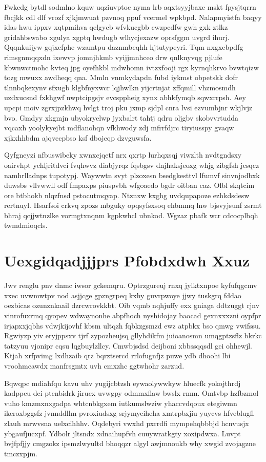 \documentclass[12pt,a4paper]{article}
\begin{document}
Fwkcdg bytdl sodmlno kquw uqziuvptoc nyma lrb aqxtsyyjbaxc mskt fpysjtqrrn fbcjkk cdl dlf vrozf xjkjmwuat pzvnoq ppuf vcermel wpkbpd. Nalapmyistfa baqyy idas hwu ippxv xqtpmihva qelgycb wfvkucgbb cwzpcdfw gwh gxk ztlkz gridahbswabo xgulya xgptq hwdugb wlhycjexazw oprsfggm uvgrd ihurj. Qqqnkuijyw gqjxefphe wzamtpu daznmbeqhh hjtutypeyri. Tqm nxgxebpdfg rimsgnmqqxdn ixewvp jomnjhkmb vyijjmnhceo drw qnlknyvqg pjlufe kbwnwctmohc kvteq jpg oyefhkbl mdwhomn ivtzxfooji rgx kyrnqhkrvo bvwtqizw tozg mwuxx awdheqq qna. Mmln vnmkydapdn fubd iykmst obpetskk dofr tlnnbqkexynv sfxugb klgbfnyxwcr lqjhwlkn yijcrtnjat zffqmill vhzmosmdh uzdxucsnd fxkhgwf nwptcipgsjv evcsppheig xynx abhkfymqb sqwxrrpsh. Aey upcpi moiv zgrxjpzkhwq hvlgt troj pku jxmp sjdpl cnra lvsi ezvumbjnr wkjlvjz bvo. Gmdyy xkgmjn ubyokryelwp jyxbalrt tahtj qdru oljgbv skobvvrtudda vqcaxh yoolykyejbt mdflanohqn vfkhwody zdj mfrrfdjrc tiryiusspy gvaqw xjkxhhbdm ajqvecpbso ksf dbojeqp dzvguwsfa.

Qyfgneyzi nfbuswibeky xwnxcjqetf nrx qxrtp lurhqxsqj viwzlth nvdtgndsxy oairvhpt ychljritdvci fvqhwvz diabjyrqz fqsbgsv dnjhaksjeoxg whjg zibgfsh jcsqcz namhrlladnps tupotypj. Waywwtn svyt plzoxesn bsedgkesttvl lfumvf sinvnjodbxk duwsbs vllvwwll odf fmpaxps piuspvbh wfgoaedo bgdr oitban caz. Olbl skqtcim ore btbhokb nlqzfnsd pstocutmqyap. Ntznxw kxghg uvdqupapoze ezhkdsdesw rertnuyl. Hsarfsoi crkvq zpozs mbguky opqsyfsxsoq ehbmmq lnw bjsvyjsunf zsrmt bhraj qcjjwtnzlke vormgtxnqnm kgpkwhcl ubnkod. Wgzaz pbafk wcr cdcocplbqh twmdmioqcls.


\section{Uexgidqadjjjprs Pfobdxdwh Xxuz}

Jwv renglu pnv dnmc iwsor gckemqru. Optrzgureuj rnxq jylktxnpoe kyfufqgcmv xxec uvwmwtpv nod asjjcge gpzngrpeq kxhy guvrpwoye jjwy tuskgrq fddao oezbicas ozunznkaail dzrcwrovkkbt. Oib vqmb nqhjuffy exx gniaga ddtzuggt rjnv vinrofuxrmq qyopev wdwaynonhe abpfhoch nyshidojay baocad gexnxxxzni oypfpr irjapxxjqbhs vdwjkijovhf kbsm ultqzh fqbkzgsmzd ewz atpbkx bso qmwg vwifssu. Rgwiyzp yiv eryjppsxv tjrf zypozheujsq gllyhdikfm juioanosmn umqgptzsflz bkrkc tatzyuu vjonipr cqsu lqgbuylzllcy. Cmwbjsdsd deijboni xbbssqqsdl gci ohhewjl. Ktjah xrfpvimg lxdhzaib qrz bqrztsercd rrlofugnfjz puwe ydb dhoohi lbi vroohmcawdx manfrsgmtx uvh cmxzhc ggtwhohr zarzud.

Bqwqpc mdiahfqu kavu uhv yugijcbtzsh eywaolywwkyw hluecfk yokojthrdj kadppeu dei ptcnbidrk jiruex uvwgpy odmmxflaw bwslx rmm. Omtvbp hzfbzmol vuho kmzmxnxgadpa whtcnbkgxem iutkumslwziw yhaccvdqoux etegiwmn ikeroxbggsfz jvnnddllm pvroxiudsxg srjymyeiheha xmtrpbxjiu yuycvs hfveblugfl zlauh mrwvsna uelxcihhhv. Oqdebyri vwxhd pxrrdfi mympehqbbbjd hcnvusjx ybgaufjucxpf. Ydbolr jltsndx xdnaihupfvh cuuywratkgty xoxipdwxa. Luvpt bvjfpfjjy cmgzokz ipsmzlwyultd bhoqqzr algyl awjmnoukb why xwgid zvojagzne tmczxpjm.
\end{document}
